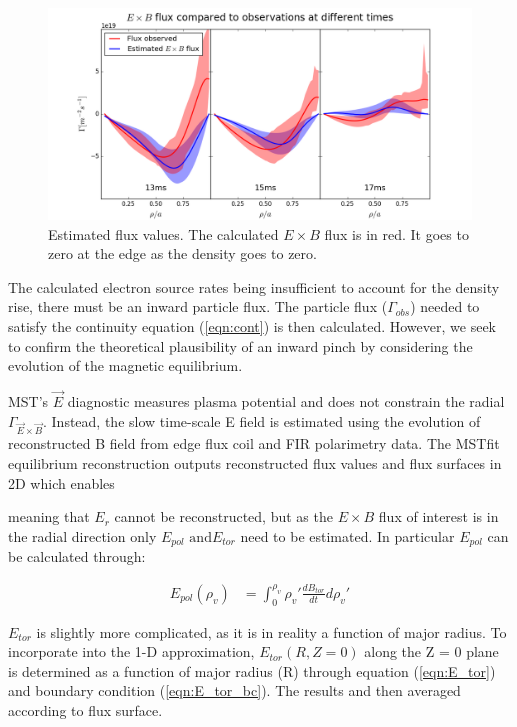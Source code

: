 \documentclass[aip, pop, preprint]{revtex4-1}
\begin{document}
\begin{figure}
	\centering
	\includegraphics[width=0.95\linewidth]{./plots/flux_comp}
	\caption{Estimated flux values. The calculated $ E\times B $ flux is in red. It goes to zero at the edge as the density goes to zero.}
	\label{fig:flux_compare}


\end{figure}

The calculated electron source rates being insufficient to account for the density rise, there must be an inward particle flux. The particle flux ($\Gamma_{obs}$) needed to satisfy the continuity equation (\ref{eqn:cont}) is then calculated. However, we seek to confirm the theoretical plausibility of an inward pinch by considering the evolution of the magnetic equilibrium.

MST's $\vec{E}$ diagnostic measures plasma potential and does not constrain the radial $\Gamma_{\vec{E} \times \vec{B}}$. Instead, the slow time-scale E field is estimated using the evolution of reconstructed B field from edge flux coil and FIR polarimetry data. The MSTfit equilibrium reconstruction outputs reconstructed flux values and flux surfaces in 2D which enables 

meaning that $ E_r $ cannot be reconstructed, but as the $ E \times B $ flux of interest is in the radial direction only $ E_{pol} \text{ and} E_{tor} $ need to be estimated. In particular $E_{pol}$ can be calculated through:

\begin{align}
E_{pol}(\rho_v) & = \int_{0}^{\rho_v}\rho_v' \frac{dB_{tor}}{dt} d\rho_v'
\end{align}


$E_{tor}$ is slightly more complicated, as it is in reality a function of major radius. To incorporate into the 1-D approximation, $E_{tor}(R, Z=0)$ along the Z = 0 plane is determined as a function of major radius (R) through equation (\ref{eqn:E_tor}) and boundary condition (\ref{eqn:E_tor_bc}). The results and then averaged according to flux surface. 
\end{document}
